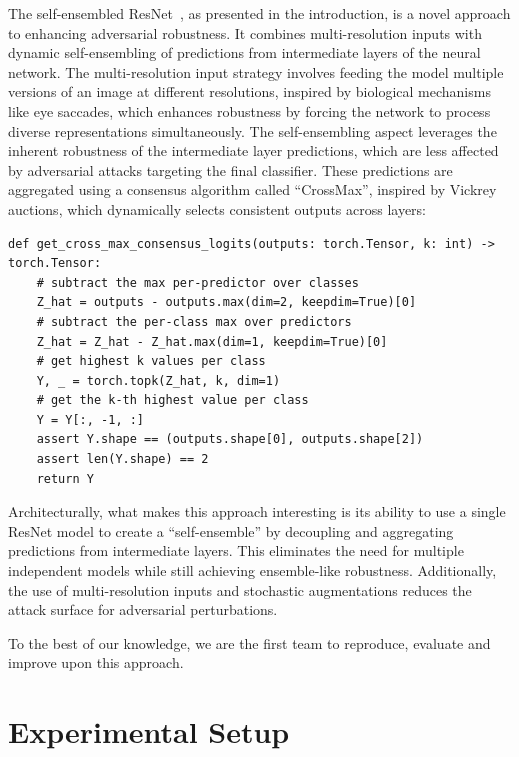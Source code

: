 \documentclass[a4paper, oneside]{discothesis}
\begin{document}
The self-ensembled ResNet~\cite{fort2024ensemble}, as presented in the introduction, is a novel approach to enhancing adversarial robustness. It combines multi-resolution inputs with dynamic self-ensembling of predictions from intermediate layers of the neural network. The multi-resolution input strategy involves feeding the model multiple versions of an image at different resolutions, inspired by biological mechanisms like eye saccades, which enhances robustness by forcing the network to process diverse representations simultaneously. The self-ensembling aspect leverages the inherent robustness of the intermediate layer predictions, which are less affected by adversarial attacks targeting the final classifier. These predictions are aggregated using a consensus algorithm called ``CrossMax'', inspired by Vickrey auctions, which dynamically selects consistent outputs across layers:

\begin{samepage}
\begin{spacing}{1}
\begin{verbatim}
def get_cross_max_consensus_logits(outputs: torch.Tensor, k: int) -> torch.Tensor:
    # subtract the max per-predictor over classes
    Z_hat = outputs - outputs.max(dim=2, keepdim=True)[0]
    # subtract the per-class max over predictors
    Z_hat = Z_hat - Z_hat.max(dim=1, keepdim=True)[0]
    # get highest k values per class
    Y, _ = torch.topk(Z_hat, k, dim=1)
    # get the k-th highest value per class
    Y = Y[:, -1, :]
    assert Y.shape == (outputs.shape[0], outputs.shape[2])
    assert len(Y.shape) == 2
    return Y
\end{verbatim}
\end{spacing}
\end{samepage}

Architecturally, what makes this approach interesting is its ability to use a single ResNet model to create a ``self-ensemble'' by decoupling and aggregating predictions from intermediate layers. This eliminates the need for multiple independent models while still achieving ensemble-like robustness. Additionally, the use of multi-resolution inputs and stochastic augmentations reduces the attack surface for adversarial perturbations.

To the best of our knowledge, we are the first team to reproduce, evaluate and improve upon this approach.

\section{Experimental Setup}
\end{document}
